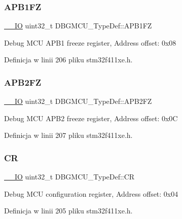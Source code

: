\subsubsection{\texorpdfstring{A\+P\+B1\+FZ}{APB1FZ}}
{\footnotesize\ttfamily \hyperlink{core__sc300_8h_aec43007d9998a0a0e01faede4133d6be}{\+\_\+\+\_\+\+IO} uint32\+\_\+t D\+B\+G\+M\+C\+U\+\_\+\+Type\+Def\+::\+A\+P\+B1\+FZ}

Debug M\+CU A\+P\+B1 freeze register, Address offset\+: 0x08 

Definicja w linii 206 pliku stm32f411xe.\+h.

\mbox{\label{struct_d_b_g_m_c_u___type_def_a011f892d86367dbe786964b14bc515a6}} 
\subsubsection{\texorpdfstring{A\+P\+B2\+FZ}{APB2FZ}}
{\footnotesize\ttfamily \hyperlink{core__sc300_8h_aec43007d9998a0a0e01faede4133d6be}{\+\_\+\+\_\+\+IO} uint32\+\_\+t D\+B\+G\+M\+C\+U\+\_\+\+Type\+Def\+::\+A\+P\+B2\+FZ}

Debug M\+CU A\+P\+B2 freeze register, Address offset\+: 0x0C 

Definicja w linii 207 pliku stm32f411xe.\+h.

\mbox{\label{struct_d_b_g_m_c_u___type_def_a15981828f2b915d38570cf6684e99a53}} 
\subsubsection{\texorpdfstring{CR}{CR}}
{\footnotesize\ttfamily \hyperlink{core__sc300_8h_aec43007d9998a0a0e01faede4133d6be}{\+\_\+\+\_\+\+IO} uint32\+\_\+t D\+B\+G\+M\+C\+U\+\_\+\+Type\+Def\+::\+CR}

Debug M\+CU configuration register, Address offset\+: 0x04 

Definicja w linii 205 pliku stm32f411xe.\+h.

\mbox{\label{struct_d_b_g_m_c_u___type_def_a0cc3561c124d06bb57dfa855e43ed99f}} 
